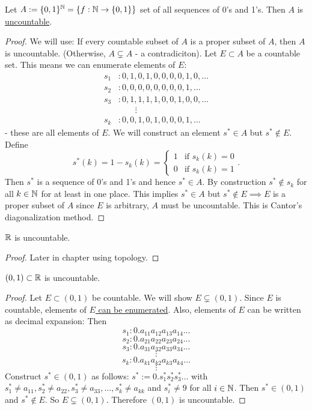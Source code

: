 \documentclass[]{article}
\begin{document}
\begin{theorem}
	Let $A:=\{0,1\}^{\mathbb{N}} = \{f:\mathbb{N}\rightarrow\{0,1\}\}$ set of all sequences of 0's and 1's.
	Then $A$ is \ul{uncountable}.
\end{theorem}
\begin{proof}
	We will use: If every countable subset of $A$ is a proper subset of $A$, then $A$ is uncountable.
	(Otherwise, $A\subsetneq A$ - a contradiciton).
	Let $E\subset A$ be a countable set. This means we can enumerate elements of $E$:
	\begin{align*}
		s_1&: 0,1,0,1,0,0,0,0,1,0,\dots \\
		s_2&: 0,0,0,0,0,0,0,0,1,\dots \\
		s_3&: 0,1,1,1,1,0,0,1,0,0,\dots \\
			&\qquad\vdots \\
		s_k&: 0,0,1,0,1,0,0,0,1,\dots
	\end{align*}
	- these are all elements of $E$.
	We will construct an element $s^*\in A$ but $s^*\notin E$.
	Define $$s^*(k) = 1-s_k(k) = \begin{cases} 1 & \text{if } s_k(k) = 0 \\ 0 & \text{if } s_k(k) = 1 \end{cases}.$$
	Then $s^*$ is a sequence of 0's and 1's and hence $s^*\in A$.
	By construction $s^*\notin s_k$ for all $k\in\mathbb{N}$ for at least in one place. 
	This implies $s^*\in A$ but $s^*\notin E \implies E$ is a proper subset of $A$ since $E$ is arbitrary, $A$ must be uncountable. This is Cantor's diagonalization method.
\end{proof}
\begin{corollary}
	$\mathbb{R}$ is uncountable.
\end{corollary}
\begin{proof}
	Later in chapter using topology.
\end{proof}

\begin{theorem}
	$(0,1)\subset \mathbb{R}$ is uncountable.
\end{theorem}
\begin{proof}
	Let $E\subset (0,1)$ be countable. We will show $E\subsetneq (0,1)$.
	Since $E$ is countable, elements of \ul{$E$ can be enumerated}. Also, elements of $E$ can be written as decimal expansion: Then
	$$s_1: 0.a_{11}a_{12}a_{13}a_{14}\dots$$
	$$s_2: 0.a_{21}a_{22}a_{23}a_{24}\dots$$
	$$s_3: 0.a_{31}a_{32}a_{33}a_{34}\dots$$
	$$ \vdots$$
	$$s_k: 0.a_{k1}a_{k2}a_{k3}a_{k4}\dots$$
	$$ \vdots $$
	Construct $s^*\in(0,1)$ as follows: $s^* := 0.s_1^*s_2^*s_3^*\dots$ with $s_1^*\neq a_{11}, s_2^*\neq a_{22}, s_3^*\neq a_{33}, \dots, s_k^* \neq a_{kk}$ and $s_i^*\neq 9$ for all $i\in\mathbb{N}$.
	Then $s^*\in(0,1)$ and $s^*\notin E$. So $E\subsetneq (0,1)$. Therefore $(0,1)$ is uncountable.
\end{proof}
\end{document}
